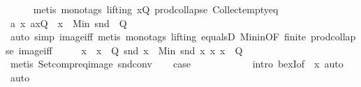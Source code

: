 \begin{isabellebody}
\ \ \ \ \isamarkupfalse%
\ {\isacharparenleft}{\kern0pt}metis\ {\isacharparenleft}{\kern0pt}mono{\isacharunderscore}{\kern0pt}tags{\isacharcomma}{\kern0pt}\ lifting{\isacharparenright}{\kern0pt}\ {\isacartoucheopen}x{\isasymin}Q{\isacartoucheclose}\ prod{\isachardot}{\kern0pt}collapse\ Collect{\isacharunderscore}{\kern0pt}empty{\isacharunderscore}{\kern0pt}eq{\isacharparenright}{\kern0pt}\isanewline
\ \ \isamarkupfalse%
\ {\isachardoublequoteopen}{\isasymexists}a\ x{\isachardot}{\kern0pt}\ {\isacharparenleft}{\kern0pt}a{\isacharcomma}{\kern0pt}x{\isacharparenright}{\kern0pt}{\isasymin}Q\ {\isasymand}\ x\ {\isacharequal}{\kern0pt}\ Min\ {\isacharparenleft}{\kern0pt}snd\ {\isacharbackquote}{\kern0pt}\ Q{\isacharparenright}{\kern0pt}{\isachardoublequoteclose}\isanewline
\ \ \ \ \isamarkupfalse%
\ {\isacharparenleft}{\kern0pt}auto\ simp{\isacharcolon}{\kern0pt}\ image{\isacharunderscore}{\kern0pt}iff{\isacharparenright}{\kern0pt}\ {\isacharparenleft}{\kern0pt}metis\ {\isacharparenleft}{\kern0pt}mono{\isacharunderscore}{\kern0pt}tags{\isacharcomma}{\kern0pt}\ lifting{\isacharparenright}{\kern0pt}\ equals{}D\ Min{\isacharunderscore}{\kern0pt}in{\isacharbrackleft}{\kern0pt}OF\ finite{\isacharbrackright}{\kern0pt}\ prod{\isachardot}{\kern0pt}collapse\ image{\isacharunderscore}{\kern0pt}iff{\isacharparenright}{\kern0pt}\isanewline
\ \ \isamarkupfalse%
\ \isamarkupfalse%
\ x\ \ {\isachardoublequoteopen}x\ {\isasymin}\ Q{\isachardoublequoteclose}\ {\isachardoublequoteopen}snd\ x\ {\isacharequal}{\kern0pt}\ Min\ {\isacharbraceleft}{\kern0pt}snd\ x{\isacharbar}{\kern0pt}\ x{\isachardot}{\kern0pt}\ x\ {\isasymin}\ Q{\isacharbraceright}{\kern0pt}{\isachardoublequoteclose}\isanewline
\ \ \ \ \isamarkupfalse%
\ {\isacharparenleft}{\kern0pt}metis\ Setcompr{\isacharunderscore}{\kern0pt}eq{\isacharunderscore}{\kern0pt}image\ snd{\isacharunderscore}{\kern0pt}conv{\isacharparenright}{\kern0pt}\isanewline
\ \ \isamarkupfalse%
\ {\isacharquery}{\kern0pt}case\isanewline
\ \ \ \ \isamarkupfalse%
\ {\isacharasterisk}{\kern0pt}\isanewline
\ \ \ \ \isamarkupfalse%
\ {\isacharparenleft}{\kern0pt}intro\ bexI{\isacharbrackleft}{\kern0pt}of\ {\isacharunderscore}{\kern0pt}\ x{\isacharbrackright}{\kern0pt}{\isacharparenright}{\kern0pt}\ auto\isanewline
{}\isamarkupfalse%
\ auto%
\endisatagproof
{\isafoldproof}%
%
\isadelimproof
\isanewline
%
\endisadelimproof
\isanewline
{}\isamarkupfalse%

\end{isabellebody}
